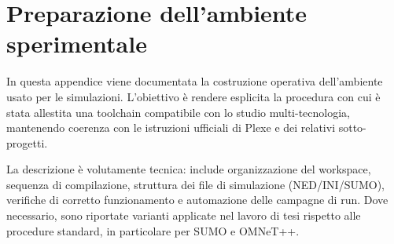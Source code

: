 \chapter[Preparazione dell’ambiente sperimentale]{Preparazione dell’ambiente\\ sperimentale}
\label{ch:setup}

In questa appendice viene documentata la costruzione operativa dell’ambiente usato per le simulazioni. L’obiettivo è rendere esplicita la procedura con cui è stata allestita una toolchain compatibile con lo studio multi-tecnologia, mantenendo coerenza con le istruzioni ufficiali di Plexe e dei relativi sotto-progetti.

La descrizione è volutamente tecnica: include organizzazione del workspace, sequenza di compilazione, struttura dei file di simulazione (NED/INI/SUMO), verifiche di corretto funzionamento e automazione delle campagne di run. Dove necessario, sono riportate varianti applicate nel lavoro di tesi rispetto alle procedure standard, in particolare per SUMO e OMNeT++.
